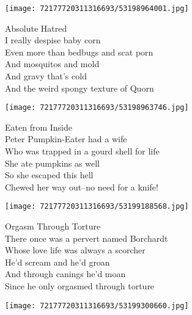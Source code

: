 \documentclass[10pt,letterpaper]{article}
\begin{document}
\begin{center}\texttt{[image: 72177720311316693/53198964001.jpg]}
\end{center}
\begin{center}
Absolute Hatred\\
\vskip 0.2in
I really despise baby corn\\
Even more than bedbugs and scat porn\\
And mosquitos and mold\\
And gravy that's cold\\
And the weird spongy texture of Quorn\\
\end{center}
\pagebreak

\begin{center}\texttt{[image: 72177720311316693/53198963746.jpg]}
\end{center}
\begin{center}
Eaten from Inside\\
\vskip 0.2in
Peter Pumpkin-Eater had a wife\\
Who was trapped in a gourd shell for life\\
She ate pumpkins as well\\
So she escaped this hell\\
Chewed her way out--no need for a knife!\\
\end{center}
\pagebreak

\begin{center}\texttt{[image: 72177720311316693/53199188568.jpg]}
\end{center}
\begin{center}
Orgasm Through Torture\\
\vskip 0.2in
There once was a pervert named Borchardt\\
Whose love life was always a scorcher\\
He'd scream and he'd groan\\
And through canings he'd moan\\
Since he only orgasmed through torture\\
\end{center}
\pagebreak

\begin{center}
\texttt{[image: 72177720311316693/53199300660.jpg]}
\end{center}
\end{document}
